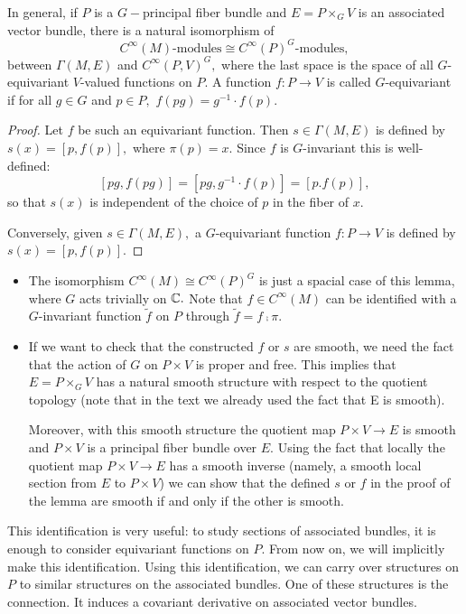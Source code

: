 \begin{lem}
 \label{JB:4.3}
In general, if $P$ is a $G-$principal fiber bundle and $E=P \times_{G} V$ is an associated vector bundle, there is a
natural isomorphism of $$C^{\infty}(M)\text{-modules}\cong C^{\infty}(P)^{G}\text{-modules},$$ between $\Gamma(M, E)$
and $C^{\infty}(P, V)^{G},$ where the last space is the space of all $G$-equivariant $V$-valued functions on $P.$ A
function $f: P \to V$ is called $G$-equivariant if for all $g \in G$ and $p \in P,$ $f(pg)=g^{-1}\cdot f(p).$
\end{lem}
 \begin{proof}
  Let $f$ be such an equivariant function. Then $s \in \Gamma(M, E)$ is defined by $s(x)=[p, f(p)],$ where $\pi(p)=x.$
Since $f$ is $G$-invariant this is well-defined:
$$
[pg, f(pg)]=[pg, g^{-1}\cdot f(p)]=[p. f(p)],
$$
so that $s(x)$ is independent of the choice of $p$ in the fiber of $x.$

Conversely, given $s \in \Gamma(M, E),$ a $G$-equivariant function $f: P \to V$ is defined by $s(x)=[p, f(p)].$
 \end{proof}

\begin{rem}
 \begin{itemize}
  \item The isomorphism $C^{\infty}(M)\cong C^{\infty}(P)^{G}$ is just a spacial case of this lemma, where $G$ acts
trivially on $\mathbb C.$ Note that $f \in C^{\infty}(M)$ can be identified with a $G$-invariant function $\tilde{f}$ on $P$
through $\tilde{f}=f \comp \pi.$
\item If we want to check that the constructed $f$ or $s$ are smooth, we need the fact that the action of $G$ on
$P\times V$ is proper and free. This implies that $E=P\times_{G} V$ has a natural smooth structure with respect to the
quotient topology (note that in the text we already used the fact that E is smooth).

Moreover, with this smooth structure the quotient map $P \times V \to E$ is smooth and $P \times V$ is a principal
fiber bundle over $E.$ Using the fact that locally the quotient map $P\times V\to E$ has a smooth inverse (namely, a
smooth local section from $E$ to $P \times V$) we can show that the defined $s$ or $f$ in the proof of the lemma are
smooth if and only if the other is smooth. 
 \end{itemize}

\end{rem}

This identification is very useful: to study sections of associated bundles, it is enough to consider equivariant
functions on $P.$ From now on, we will implicitly make this identification. Using this identification, we can carry
over structures on $P$ to similar structures on the associated bundles. One of these structures is the connection. It
induces a covariant derivative on associated vector bundles.

